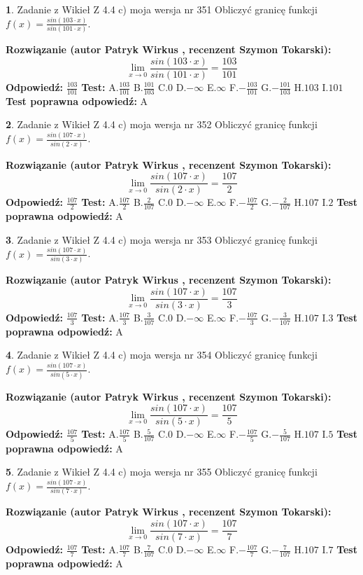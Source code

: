 \documentclass[12pt, a4paper]{article}
\theoremstyle{definition} %
\newtheorem{zad}{}
\newcommand{\zadStart}[1]{\begin{zad}#1\newline}
\newcommand{\zadStop}{\end{zad}}
\newcommand{\rozwStart}[2]{\noindent \textbf{Rozwiązanie (autor #1 , recenzent #2): }\newline}
\newcommand{\rozwStop}{\newline}
\newcommand{\odpStart}{\noindent \textbf{Odpowiedź:}\newline}
\newcommand{\odpStop}{\newline}
\newcommand{\testStart}{\noindent \textbf{Test:}\newline}
\newcommand{\testStop}{\newline}
\newcommand{\kluczStart}{\noindent \textbf{Test poprawna odpowiedź:}\newline}
\newcommand{\kluczStop}{\newline}
\begin{document}
\zadStart{Zadanie z Wikieł Z 4.4 c) moja wersja nr 351}
Obliczyć granicę funkcji $f(x)=\frac{sin(103\cdot x)}{sin(101\cdot x)}$.
\zadStop
\rozwStart{Patryk Wirkus}{Szymon Tokarski}
$$\lim\limits_{x\to 0}\frac{sin(103\cdot x)}{sin(101\cdot x)}=
\frac{103}{101}$$
\rozwStop
\odpStart
$\frac{103}{101}$
\odpStop
\testStart
A.$\frac{103}{101}$
B.$\frac{101}{103}$
C.$0$
D.$-\infty$
E.$\infty$
F.$-\frac{103}{101}$
G.$-\frac{101}{103}$
H.$103$
I.$101$
\testStop
\kluczStart
A
\kluczStop



\zadStart{Zadanie z Wikieł Z 4.4 c) moja wersja nr 352}
Obliczyć granicę funkcji $f(x)=\frac{sin(107\cdot x)}{sin(2\cdot x)}$.
\zadStop
\rozwStart{Patryk Wirkus}{Szymon Tokarski}
$$\lim\limits_{x\to 0}\frac{sin(107\cdot x)}{sin(2\cdot x)}=
\frac{107}{2}$$
\rozwStop
\odpStart
$\frac{107}{2}$
\odpStop
\testStart
A.$\frac{107}{2}$
B.$\frac{2}{107}$
C.$0$
D.$-\infty$
E.$\infty$
F.$-\frac{107}{2}$
G.$-\frac{2}{107}$
H.$107$
I.$2$
\testStop
\kluczStart
A
\kluczStop



\zadStart{Zadanie z Wikieł Z 4.4 c) moja wersja nr 353}
Obliczyć granicę funkcji $f(x)=\frac{sin(107\cdot x)}{sin(3\cdot x)}$.
\zadStop
\rozwStart{Patryk Wirkus}{Szymon Tokarski}
$$\lim\limits_{x\to 0}\frac{sin(107\cdot x)}{sin(3\cdot x)}=
\frac{107}{3}$$
\rozwStop
\odpStart
$\frac{107}{3}$
\odpStop
\testStart
A.$\frac{107}{3}$
B.$\frac{3}{107}$
C.$0$
D.$-\infty$
E.$\infty$
F.$-\frac{107}{3}$
G.$-\frac{3}{107}$
H.$107$
I.$3$
\testStop
\kluczStart
A
\kluczStop



\zadStart{Zadanie z Wikieł Z 4.4 c) moja wersja nr 354}
Obliczyć granicę funkcji $f(x)=\frac{sin(107\cdot x)}{sin(5\cdot x)}$.
\zadStop
\rozwStart{Patryk Wirkus}{Szymon Tokarski}
$$\lim\limits_{x\to 0}\frac{sin(107\cdot x)}{sin(5\cdot x)}=
\frac{107}{5}$$
\rozwStop
\odpStart
$\frac{107}{5}$
\odpStop
\testStart
A.$\frac{107}{5}$
B.$\frac{5}{107}$
C.$0$
D.$-\infty$
E.$\infty$
F.$-\frac{107}{5}$
G.$-\frac{5}{107}$
H.$107$
I.$5$
\testStop
\kluczStart
A
\kluczStop



\zadStart{Zadanie z Wikieł Z 4.4 c) moja wersja nr 355}
Obliczyć granicę funkcji $f(x)=\frac{sin(107\cdot x)}{sin(7\cdot x)}$.
\zadStop
\rozwStart{Patryk Wirkus}{Szymon Tokarski}
$$\lim\limits_{x\to 0}\frac{sin(107\cdot x)}{sin(7\cdot x)}=
\frac{107}{7}$$
\rozwStop
\odpStart
$\frac{107}{7}$
\odpStop
\testStart
A.$\frac{107}{7}$
B.$\frac{7}{107}$
C.$0$
D.$-\infty$
E.$\infty$
F.$-\frac{107}{7}$
G.$-\frac{7}{107}$
H.$107$
I.$7$
\testStop
\kluczStart
A
\kluczStop
\end{document}
